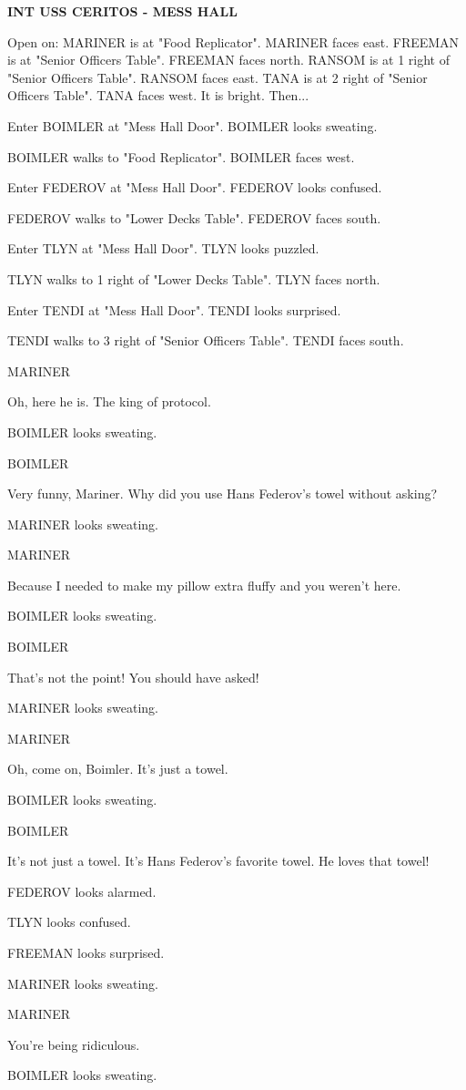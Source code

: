 \documentclass[11pt,letterpaper,oldstylefigures]{memoir}
\newcommand{\slugline}[1]{\nobreak\textbf{\MakeUppercase{#1}}\par\nobreak\vspace{1\baselineskip}}
\newcommand{\speaker}[1]{\nobreak\hspace*{0.333\textwidth}\MakeUppercase{#1}\par\nobreak\vspace{0.5\baselineskip}}
\newcommand{\dialogue}[1]{\nobreak\hspace*{0.25\textwidth}\begin{minipage}{0.5\textwidth}#1\end{minipage}\par\vspace{1\baselineskip}}
\newcommand{\stagedir}[1]{#1\par\vspace{1\baselineskip}}
\newenvironment{FountainExample}
  {\begingroup
  \ttfamily\small
   \setlength{\parindent}{0pt}
  \setlength{\parskip}{0.5em}
  \allowdisplaybreaks
  \setlength{\displaywidowpenalty}{0}
  \setlength{\widowpenalty}{0}
  \setlength{\clubpenalty}{0}
  \setlength{\interlinepenalty}{0}
}
  {\endgroup}
\begin{document}
\begin{FountainExample}
\slugline{INT USS CERITOS - MESS HALL}

\stagedir{Open on: MARINER is at "Food Replicator". MARINER faces east. FREEMAN is at "Senior Officers Table". FREEMAN faces north. RANSOM is at 1 right of "Senior Officers Table". RANSOM faces east. TANA is at 2 right of "Senior Officers Table". TANA faces west. It is bright. Then...}
\stagedir{Enter BOIMLER at "Mess Hall Door". BOIMLER looks sweating.}
\stagedir{BOIMLER walks to "Food Replicator". BOIMLER faces west.}
\stagedir{Enter FEDEROV at "Mess Hall Door". FEDEROV looks confused.}
\stagedir{FEDEROV walks to "Lower Decks Table". FEDEROV faces south.}
\stagedir{Enter TLYN at "Mess Hall Door". TLYN looks puzzled.}
\stagedir{TLYN walks to 1 right of "Lower Decks Table". TLYN faces north.}
\stagedir{Enter TENDI at "Mess Hall Door". TENDI looks surprised.}
\stagedir{TENDI walks to 3 right of "Senior Officers Table". TENDI faces south.}

\speaker{MARINER}
\dialogue{Oh, here he is. The king of protocol.}

\stagedir{BOIMLER looks sweating.}

\speaker{BOIMLER}
\dialogue{Very funny, Mariner. Why did you use Hans Federov's towel without asking?}

\stagedir{MARINER looks sweating.}

\speaker{MARINER}
\dialogue{Because I needed to make my pillow extra fluffy and you weren't here.}

\stagedir{BOIMLER looks sweating.}

\speaker{BOIMLER}
\dialogue{That's not the point! You should have asked!}

\stagedir{MARINER looks sweating.}

\speaker{MARINER}
\dialogue{Oh, come on, Boimler. It's just a towel.}

\stagedir{BOIMLER looks sweating.}

\speaker{BOIMLER}
\dialogue{It's not just a towel. It's Hans Federov's favorite towel. He loves that towel!}

\stagedir{FEDEROV looks alarmed.}

\stagedir{TLYN looks confused.}

\stagedir{FREEMAN looks surprised.}

\stagedir{MARINER looks sweating.}

\speaker{MARINER}
\dialogue{You're being ridiculous.}

\stagedir{BOIMLER looks sweating.}


\end{FountainExample}
\end{document}
